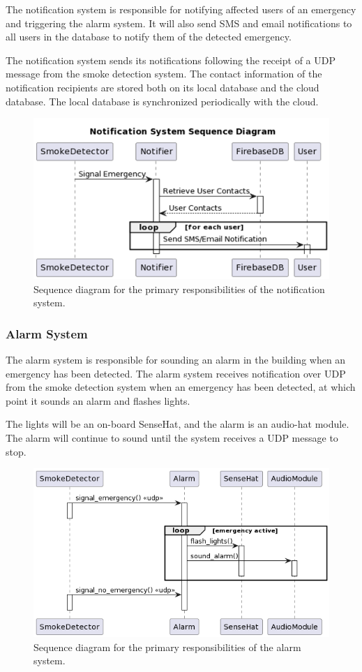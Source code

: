 The notification system is responsible for notifying affected users of an emergency and triggering the alarm system. It
will also send SMS and email notifications to all users in the database to notify them of the detected emergency.

The notification system sends its notifications following the receipt of a UDP message from the smoke detection system.
The contact information of the notification recipients are stored both on its local database and the cloud database.
The local database is synchronized periodically with the cloud.

\begin{figure}[H]
    \centering
    \includegraphics[width=5in]{../assets/NotifierSequence.png}
    \caption{Sequence diagram for the primary responsibilities of the notification system.}
    \label{fig:notifier-sq}
\end{figure}

\subsubsection{Alarm System}

The alarm system is responsible for sounding an alarm in the building when an emergency has been detected. The alarm
system receives notification over UDP from the smoke detection system when an emergency has been detected, at which
point it sounds an alarm and flashes lights.

The lights will be an on-board SenseHat, and the alarm is an audio-hat module. The alarm will continue to sound until
the system receives a UDP message to stop.

\begin{figure}[H]
    \centering
    \includegraphics[width=5in]{../assets/AlarmSequence.png}
    \caption{Sequence diagram for the primary responsibilities of the alarm system.}
\end{figure}

